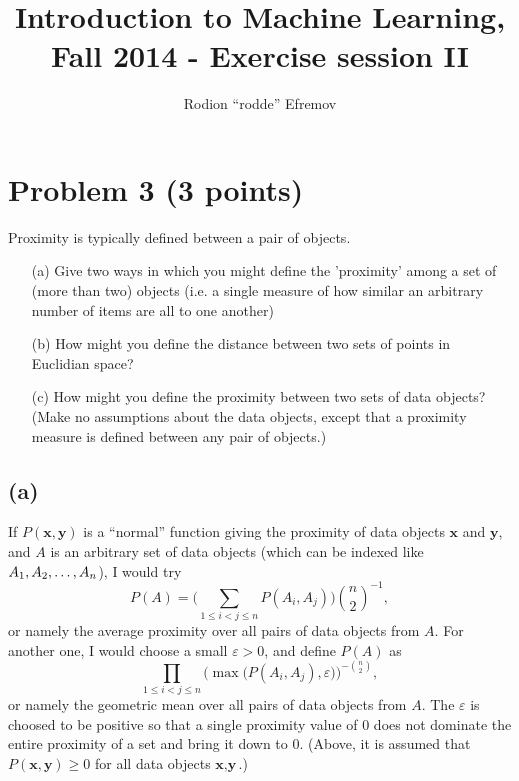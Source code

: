 \documentclass[10pt]{article}
\title{Introduction to Machine Learning, Fall 2014 - Exercise session II}
\author{Rodion ``rodde'' Efremov}
\begin{document}
 \maketitle

\color{red}
\section*{Problem 3 (3 points)}
Proximity is typically defined between a pair of objects.
\begin{itemize}
\item[(a)] Give two ways in which you might define the 'proximity' among a set of (more than two) objects (i.e. a single measure of how similar an arbitrary number of items are all to one another)
\item[(b)] How might you define the distance between two sets of points in Euclidian space?
\item[(c)] How might you define the proximity between two sets of data objects? (Make no assumptions about the data objects, except that a proximity measure is defined between any pair of objects.)
\end{itemize}

\color{black}
\subsection*{(a)}
If $P(\textbf{x}, \textbf{y})$ is a ``normal'' function giving the proximity of data objects $\textbf{x}$ and $\textbf{y}$, and $A$ is an arbitrary set of data objects (which can be indexed like $A_1, A_2, \dots,\\ A_n$), I would try 
\[
P(A) = \Bigg( \sum_{1 \leq i < j \leq n} P(A_i, A_j) \Bigg)\binom{n}{2}^{-1},
\]
or namely the average proximity over all pairs of data objects from $A$. For another one, I would choose a small $\varepsilon > 0$, and define $P(A)$ as
\[
\prod_{1 \leq i < j \leq n} \bigg( \max \big( P(A_i, A_j), \varepsilon \big) \bigg)^{ - \binom{n}{2}},
\]
or namely the geometric mean over all pairs of data objects from $A$. The $\varepsilon$ is choosed to be positive so that a single proximity value of 0 does not dominate the entire proximity of a set and bring it down to 0. (Above, it is assumed that $P(\textbf{x}, \textbf{y}) \geq 0$ for all data objects $\textbf{x}, \textbf{y}$.)
 
 
 
\end{document}
